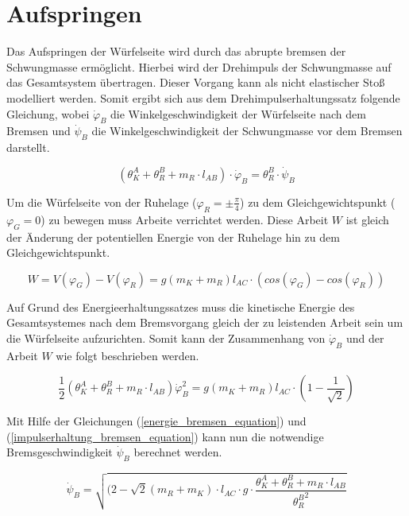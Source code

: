 \section{Aufspringen}
Das Aufspringen der Würfelseite wird durch das abrupte bremsen der Schwungmasse ermöglicht. Hierbei wird der Drehimpuls der Schwungmasse auf das Gesamtsystem übertragen. Dieser Vorgang kann als nicht elastischer Stoß modelliert werden. Somit ergibt sich aus dem Drehimpulserhaltungssatz folgende Gleichung, wobei $\dot{\varphi}_B$ die Winkelgeschwindigkeit der Würfelseite nach dem Bremsen und $\dot{\psi}_B$ die Winkelgeschwindigkeit der Schwungmasse vor dem Bremsen darstellt.

\begin{equation}
\label{impulserhaltung_bremsen_equation}
(\theta^A_K + \theta^B_R + m_R \cdot l_{AB}) \cdot \dot{\varphi}_B = \theta^B_R \cdot \dot{\psi}_B
\end{equation} 

Um die Würfelseite von der Ruhelage ($\varphi_R = \pm \frac{\pi}{4}$) zu dem Gleichgewichtspunkt ($\varphi_G = 0$) zu bewegen muss Arbeite verrichtet werden. Diese Arbeit $W$ ist gleich der Änderung der potentiellen Energie von der Ruhelage hin zu dem Gleichgewichtspunkt.

\begin{equation}
\label{arbeit_bremsen_equation}
W = V(\varphi_G) - V(\varphi_R) = g(m_K + m_R) l_{AC} \cdot (cos(\varphi_G) - cos(\varphi_R))
\end{equation}

Auf Grund des Energieerhaltungssatzes muss die kinetische Energie des Gesamtsystemes nach dem Bremsvorgang gleich der zu leistenden Arbeit sein um die Würfelseite aufzurichten. Somit kann der Zusammenhang von $\dot{\varphi}_B$ und der Arbeit $W$ wie folgt beschrieben werden.

\begin{equation}
\label{energie_bremsen_equation}
\frac{1}{2}(\theta^A_K + \theta^B_R + m_R \cdot l_{AB}) \dot{\varphi}_B^2 = g(m_K + m_R) l_{AC} \cdot (1 - \frac{1}{\sqrt{2}})
\end{equation}

Mit Hilfe der Gleichungen (\ref{energie_bremsen_equation}) und (\ref{impulserhaltung_bremsen_equation}) kann nun die notwendige Bremsgeschwindigkeit $\dot{\psi}_B$ berechnet werden.

\begin{equation}
\label{psi_bremsen_equation}
\dot{\psi}_B = \sqrt{(2-\sqrt{2}(m_R + m_K) \cdot l_{AC} \cdot g \cdot \frac{\theta^A_K + \theta^B_R + m_R \cdot l_{AB}}{{\theta^B_R}^2}}
\end{equation}

